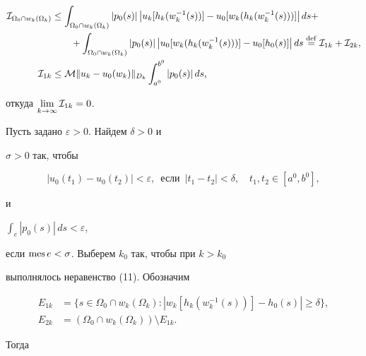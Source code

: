 \begin{pf}
\begin{align*}
{\cal I}_{\Omega_0\cap w_k(\Omega_k)}&\leq


\int_{\Omega_0\cap w_k(\Omega_k)}


|p_0(s)|\,\big |u_k[h_k(w_k^{-1}(s))] -


u_0[w_k(h_k(w_k^{-1}(s)))]\big|\,ds + \\


%


&\qquad+\int_{\Omega_0\cap w_k(\Omega_k)}


|p_0(s)|\,\big |u_0[w_k(h_k(w_k^{-1}(s)))] -


u_0[h_0(s)]\big|\,ds \eqdef {\cal I}_{1k} + {\cal I}_{2k},\\


%


{\cal I}_{1k} &\leq {\cal M} \|u_k-u_0(w_k)\|_{D_k}


\int_{a^0}^{b^0} |p_0(s)|\,ds,


\end{align*}


откуда $\lim\limits_{k\to\infty} {\cal I}_{1k} =0$.





Пусть задано $\varepsilon>0$. Найдем $\delta >0$ и


$\sigma >0$ так, чтобы


$$


|u_0(t_1)-u_0(t_2)|<\varepsilon,\ \; \text{если}\ \;|t_1-t_2|<\delta,


\quad t_1,t_2\in[a^0,b^0],


$$


и


$\displaystyle \int_{e}|p_0(s)|\,ds <\varepsilon$,


если $\operatorname{mes} e<\sigma$. Выберем $k_0$ так, чтобы при $k>k_0$


выполнялось неравенство (11). Обозначим


\begin{align*}


E_{1k} &= \{s\in\Omega_0\cap w_k(\Omega_k):


|w_k[h_k(w_k^{-1}(s))]-h_0(s)|


\geq \delta\},\\


%


E_{2k} &= (\Omega_0\cap w_k(\Omega_k)) \setminus E_{1k}.


\end{align*}


Тогда


\begin{multline*}



\end{multline*}
\end{pf}

